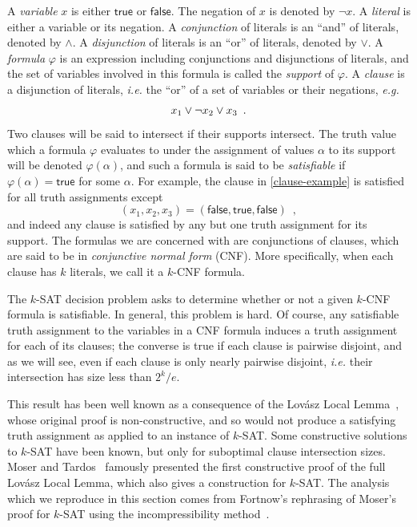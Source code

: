 \documentclass{patmorin}
\begin{document}
A \emph{variable} $x$ is either $\textsf{true}$ or
$\textsf{false}$. The negation of $x$ is denoted by $\neg x$. A
\emph{literal} is either a variable or its negation. A
\emph{conjunction} of literals is an ``and'' of literals, denoted by
$\land$. A \emph{disjunction} of literals is an ``or'' of literals,
denoted by $\lor$. A \emph{formula} $\varphi$ is an expression
including conjunctions and disjunctions of literals, and the set of
variables involved in this formula is called the \emph{support} of
$\varphi$. A \emph{clause} is a disjunction of literals, \emph{i.e.}
the ``or'' of a set of variables or their negations, \emph{e.g.}
\begin{align}
  x_1 \lor \neg x_2 \lor x_3 \enspace . \eqlabel{clause-example}
\end{align}
Two clauses will be said to intersect if their supports intersect. The
truth value which a formula $\varphi$ evaluates to under the
assignment of values $\alpha$ to its support will be denoted
$\varphi(\alpha)$, and such a formula is said to be \emph{satisfiable}
if $\varphi(\alpha) = \textsf{true}$ for some $\alpha$. For example,
the clause in \eqref{clause-example} is satisfied for all truth
assignments except
\[
(x_1, x_2, x_3) = (\textsf{false}, \textsf{true}, \textsf{false}) \enspace ,
\]
and indeed any clause is satisfied by any but one truth assignment for
its support. The formulas we are concerned with are conjunctions of
clauses, which are said to be in \emph{conjunctive normal form}
(CNF). More specifically, when each clause has $k$ literals, we call
it a $k$-CNF formula.

The $k$-SAT decision problem asks to determine whether or not a given
$k$-CNF formula is satisfiable. In general, this problem is hard. Of
course, any satisfiable truth assignment to the variables in a CNF
formula induces a truth assignment for each of its clauses; the
converse is true if each clause is pairwise disjoint, and as we will
see, even if each clause is only nearly pairwise disjoint, \emph{i.e.}
their intersection has size less than $2^k/e$.

This result has been well known as a consequence of the Lov\'{a}sz
Local Lemma~\cite{lovasz:locallemma}, whose original proof is
non-constructive, and so would not produce a satisfying truth
assignment as applied to an instance of $k$-SAT. Some constructive
solutions to $k$-SAT have been known, but only for suboptimal clause
intersection sizes. Moser and Tardos~\cite{moser:locallemma} famously
presented the first constructive proof of the full Lov\'{a}sz Local
Lemma, which also gives a construction for $k$-SAT. The analysis which
we reproduce in this section comes from Fortnow's rephrasing of
Moser's proof for $k$-SAT using the incompressibility
method~\cite{fortnow:ksat}.
\end{document}

